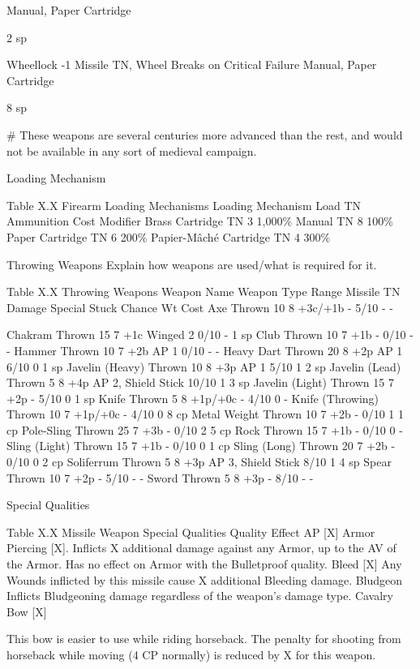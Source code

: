 \documentclass[oneside,11pt,english]{book}
\begin{document}
Manual, Paper 
Cartridge 

2 sp 

Wheellock -1 Missile TN, Wheel Breaks on Critical Failure Manual, Paper 
Cartridge 

8 sp 

\# These weapons are several centuries more advanced than the rest, and would not be available in any sort of medieval campaign. 

 

Loading Mechanism 

 
Table X.X Firearm Loading Mechanisms 
Loading Mechanism Load TN Ammunition Cost Modifier 
Brass Cartridge TN 3 1,000\% 
Manual TN 8 100\% 
Paper Cartridge TN 6 200\% 
Papier-Mâché Cartridge TN 4 300\% 

 

Throwing Weapons 
Explain how weapons are used/what is required for it. 

 
Table X.X Throwing Weapons 
Weapon Name Weapon Type Range Missile TN Damage Special Stuck Chance Wt Cost 
Axe Thrown 10 8 +3c/+1b - 5/10 - - 


Chakram Thrown 15 7 +1c Winged 2 0/10 - 1 sp 
Club Thrown 10 7 +1b - 0/10 - - 
Hammer Thrown 10 7 +2b AP 1 0/10 - - 
Heavy Dart Thrown 20 8 +2p AP 1 6/10 0 1 sp 
Javelin (Heavy) Thrown 10 8 +3p AP 1 5/10 1 2 sp 
Javelin (Lead) Thrown 5 8 +4p AP 2, Shield Stick 10/10 1 3 sp 
Javelin (Light) Thrown 15 7 +2p - 5/10 0 1 sp 
Knife Thrown 5 8 +1p/+0c - 4/10 0 - 
Knife (Throwing) Thrown 10 7 +1p/+0c - 4/10 0 8 cp 
Metal Weight Thrown 10 7 +2b - 0/10 1 1 cp 
Pole-Sling Thrown 25 7 +3b - 0/10 2 5 cp 
Rock Thrown 15 7 +1b - 0/10 0 - 
Sling (Light) Thrown 15 7 +1b - 0/10 0 1 cp 
Sling (Long) Thrown 20 7 +2b - 0/10 0 2 cp 
Soliferrum Thrown 5 8 +3p AP 3, Shield Stick 8/10 1 4 sp 
Spear Thrown 10 7 +2p - 5/10 - - 
Sword Thrown 5 8 +3p - 8/10 - - 

 

Special Qualities 

 
Table X.X Missile Weapon Special Qualities 
Quality Effect 
AP [X] Armor Piercing [X]. Inflicts X additional damage against any Armor, up to the AV of the Armor. Has 
no effect on Armor with the Bulletproof quality. 
Bleed [X] Any Wounds inflicted by this missile cause X additional Bleeding damage. 
Bludgeon Inflicts Bludgeoning damage regardless of the weapon’s damage type. 
Cavalry 
Bow [X] 

This bow is easier to use while riding horseback. The penalty for shooting from horseback while 
moving (4 CP normally) is reduced by X for this weapon. 
\end{document}
